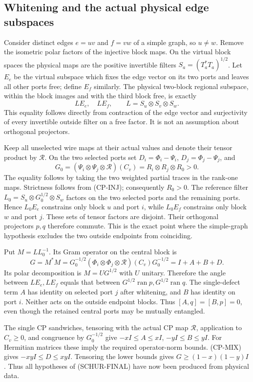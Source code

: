 \subsection{Whitening and the actual physical edge subspaces}
Consider distinct edges $e=uv$ and $f=vw$ of a simple graph, so $u\ne w$.
Remove the isometric polar factors of the injective block maps. On the
virtual block spaces the physical maps are the positive invertible filters
$S_a=(T_a^*T_a)^{1/2}$. Let $E_e$ be the virtual subspace which fixes the
edge vector on its two ports and leaves all other ports free; define $E_f$
similarly. The physical two-block regional subspace, within the block
images and with the third block free, is exactly
\[
 L E_e,\quad L E_f,\qquad L=S_u\otimes S_v\otimes S_w.
\tag{PHYS-RANGE}
\]
This equality follows directly from contraction of the edge vector and
surjectivity of every invertible outside filter on a free factor.
It is not an assumption about orthogonal projectors.

Keep all unselected wire maps at their actual values and denote their
tensor product by $\mathcal R$. On the two selected ports set
$D_i=\Phi_i-\Psi_i$, $D_j=\Phi_j-\Psi_j$, and
\[
 G_0=(\Psi_i\otimes\Psi_j\otimes\mathcal R)(C_v)
     =R_i\otimes R_j\otimes R_0>0.
\]
The equality follows by taking the two weighted partial traces in the
rank-one maps. Strictness follows from (CP-INJ); consequently $R_0>0$.
The reference filter
$L_0=S_u\otimes G_0^{1/2}\otimes S_w$ factors on the two selected ports
and the remaining ports. Hence $L_0E_e$ constrains only block $u$ and
port $i$, while $L_0E_f$ constrains only block $w$ and port $j$.
These sets of tensor factors are disjoint. Their orthogonal projectors
$p,q$ therefore commute. This is the exact point where the simple-graph
hypothesis excludes the two outside endpoints from coinciding.

Put $M=LL_0^{-1}$. Its Gram operator on the central block is
\[
 G=M^*M=G_0^{-1/2}(\Phi_i\otimes\Phi_j\otimes\mathcal R)(C_v)G_0^{-1/2}
      =I+A+B+D.
\]
Its polar decomposition is $M=UG^{1/2}$ with $U$ unitary. Therefore the
angle between $LE_e,LE_f$ equals that between
$G^{1/2}\operatorname{ran}p,G^{1/2}\operatorname{ran}q$.
The single-defect term $A$ has identity on selected port $j$ after
whitening, and $B$ has identity on port $i$. Neither acts on the outside
endpoint blocks. Thus $[A,q]=[B,p]=0$, even though the retained central
ports may be mutually entangled.

The single CP sandwiches, tensoring with the actual CP map $\mathcal R$,
application to $C_v\ge0$, and congruence by $G_0^{-1/2}$ give
$-xI\le A\le xI$, $-yI\le B\le yI$. For Hermitian matrices these imply
the required operator-norm bounds. (CP-MIX) gives $-xyI\le D\le xyI$.
Tensoring the lower bounds gives $G\ge(1-x)(1-y)I$. Thus all hypotheses
of (SCHUR-FINAL) have now been produced from physical data.

